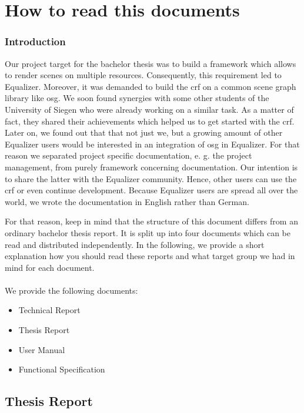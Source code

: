 
\chapter{How to read this documents}

\subsection*{Introduction}
Our project target for the bachelor thesis was to build a framework which allows to render scenes on multiple resources. Consequently, this requirement led to Equalizer. Moreover, it was demanded to build the \gls{crf} on a common scene graph library like \gls{osg}. We soon found synergies with some other students of the University of Siegen who were already working on a similar task. As a matter of fact, they shared their achievements which helped us to get started with the \gls{crf}. Later on, we found out that that not just we, but a growing amount of other Equalizer users would be interested in an integration of \gls{osg} in Equalizer. For that reason we separated project specific documentation, e. g. the project management, from purely framework concerning documentation. Our intention is to share the latter with the Equalizer community. Hence, other users can use the \gls{crf} or even continue development. Because Equalizer users are spread all over the world, we wrote the documentation in English rather than German.

For that reason, keep in mind that the structure of this document differs from an ordinary bachelor thesis report. It is split up into four documents which can be read and distributed independently. In the following, we provide a short explanation how you should read these reports and what target group we had in mind for each document.\\
\\
We provide the following documents:
\begin{itemize}
	\item Technical Report
	\item Thesis Report
	\item User Manual
	\item Functional Specification
\end{itemize}

\section*{Thesis Report}


